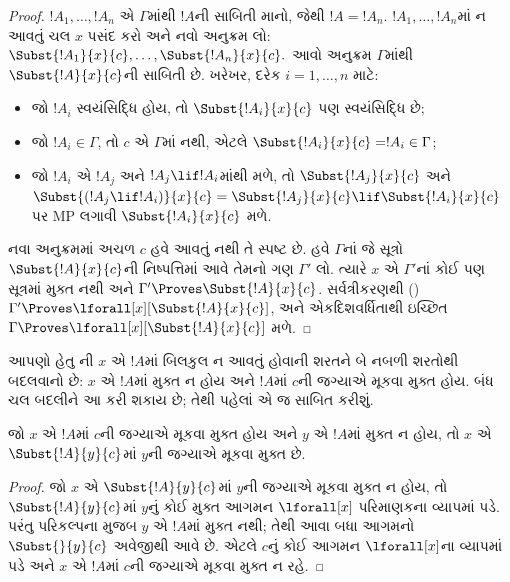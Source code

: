 \begin{proof} $!A_1,\ldots,!A_n$ એ $\Gamma$માંથી
$!A$ની સાબિતી માનો, જેથી $!A=!A_n$.
$!A_1,\ldots,!A_n$માં ન આવતું
ચલ $x$ પસંદ કરો અને
નવો અનુક્રમ લો:
$\Subst{!A_1}{x}{c},\ldots,\Subst{!A_n}{x}{c}.$
આવો અનુક્રમ $\Gamma$માંથી
$\Subst{!A}{x}{c}$ની સાબિતી છે.
ખરેખર, દરેક $i=1,\ldots,n$ માટે:
\begin{itemize}
\item જો $!A_i$ સ્વયંસિદ્ધિ હોય, તો
$\Subst{!A_i}{x}{c}$ પણ સ્વયંસિદ્ધિ છે;
\item જો $!A_i \in \Gamma$, તો
$c$ એ $\Gamma$માં નથી,
એટલે $\Subst{!A_i}{x}{c} = !A_i \in \Gamma$;
\item જો $!A_i$ એ $!A_j$
અને $!A_j \lif !A_i$માંથી મળે,
તો $\Subst{!A_j}{x}{c}$ અને
$\Subst{(!A_j \lif !A_i)}{x}{c}
= \Subst{!A_j}{x}{c} \lif \Subst{!A_i}{x}{c}$
પર MP લગાવી $\Subst{!A_i}{x}{c}$ મળે.
\end{itemize}
નવા અનુક્રમમાં અચળ $c$
હવે આવતું નથી તે સ્પષ્ટ છે.
હવે $\Gamma$નાં જે સૂત્રો
$\Subst{!A}{x}{c}$ની નિષ્પત્તિમાં
આવે તેમનો ગણ $\Gamma'$ લો.
ત્યારે $x$ એ $\Gamma'$નાં
કોઈ પણ સૂત્રમાં મુક્ત નથી
અને $\Gamma' \Proves \Subst{!A}{x}{c}$.
સર્વત્રીકરણથી
()
$\Gamma' \Proves \lforall[x][\Subst{!A}{x}{c}]$,
અને એકદિશવર્ધિતાથી ઇચ્છિત
$\Gamma \Proves \lforall[x][\Subst{!A}{x}{c}]$ મળે.
\end{proof}

\begin{explain}
આપણો હેતુ ની
$x$ એ $!A$માં બિલકુલ ન આવતું
હોવાની શરતને બે નબળી શરતોથી
બદલવાનો છે: $x$ એ $!A$માં
મુક્ત ન હોય અને $!A$માં
$c$ની જગ્યાએ મૂકવા મુક્ત
હોય. બંધ ચલ બદલીને
આ કરી શકાય છે; તેથી પહેલાં
એ જ સાબિત કરીશું.
\end{explain}

\begin{lem}
જો $x$ એ $!A$માં $c$ની જગ્યાએ
મૂકવા મુક્ત હોય અને $y$ એ $!A$માં
મુક્ત ન હોય, તો $x$ એ
$\Subst{!A}{y}{c}$માં $y$ની
જગ્યાએ મૂકવા મુક્ત છે.
\end{lem}

\begin{proof} જો $x$ એ
$\Subst{!A}{y}{c}$માં
$y$ની જગ્યાએ મૂકવા
મુક્ત ન હોય,
તો $\Subst{!A}{y}{c}$માં
$y$નું કોઈ મુક્ત આગમન
$\lforall[x]$ પરિમાણકના
વ્યાપમાં પડે. પરંતુ
પરિકલ્પના મુજબ $y$
એ $!A$માં મુક્ત નથી;
તેથી આવા બધા આગમનો
$\Subst{}{y}{c}$ અવેજીથી
આવે છે. એટલે $c$નું
કોઈ આગમન $\lforall[x]$ના
વ્યાપમાં પડે અને $x$
એ $!A$માં $c$ની
જગ્યાએ મૂકવા
મુક્ત ન રહે.

\end{proof}

